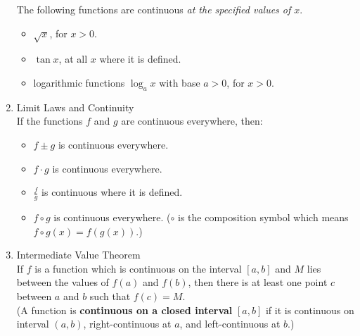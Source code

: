 \begin{enumerate}
\begin{itemize}
        \end{itemize}
        The following functions are continuous \textit{at the specified values of $x$}.
        \begin{itemize}
            \item $\sqrt{x}$, for $x>0$.
            \item $\tan x$, at all $x$ where it is defined.
            \item logarithmic functions $\log_a x$ with base $a>0$, for $x>0$.
        \end{itemize}
    \item Limit Laws and Continuity \\
        If the functions $f$ and $g$ are continuous everywhere, then:
        \begin{itemize}
            \item $f\pm g$ is continuous everywhere.
            \item $f\cdot g$ is continuous everywhere.
            \item $\frac{f}{g}$ is continuous where it is defined.
            \item $f\circ g$ is continuous everywhere. ($\circ$ is the composition symbol which means $f\circ g(x)=f(g(x))$.)
        \end{itemize}
    \item Intermediate Value Theorem \\
        If $f$ is a function which is continuous on the interval $[a, b]$ and $M$ lies between the values of $f(a)$ and $f(b)$, then there is at least one point $c$ between $a$ and $b$ such that $f(c)=M$. \\
        (A function is \textbf{continuous on a closed interval} $[a, b]$ if it is continuous on interval $(a, b)$, right-continuous at $a$, and left-continuous at $b$.)
\end{enumerate}
